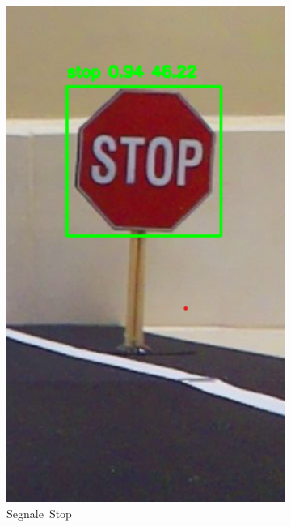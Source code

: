 \documentclass{article}
\begin{document}
\begin{figure}[h!]
    \begin{subfigure}[b]{0.3\textwidth}
        \centering
        \includegraphics[width=\linewidth]{img/stop.png}
        \caption{Segnale Stop}
        \label{fig:stop}
    \end{subfigure}
    \hfill
    \begin{subfigure}[b]{0.3\textwidth}
        \centering

\end{subfigure}
\end{figure}
\end{document}
